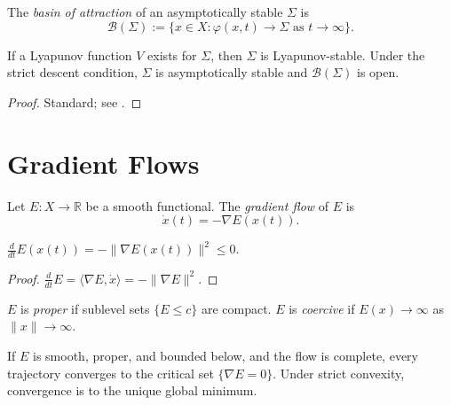 \documentclass[11pt,openany]{book}
\begin{document}
\begin{definition}
The \emph{basin of attraction} of an asymptotically stable
$\Sigma$ is
\[
  \mathcal{B}(\Sigma) := \{x \in X :
    \varphi(x,t) \to \Sigma \text{ as } t \to \infty\}.
\]
\end{definition}

\begin{theorem}
\label{thm:lyapunov-main}
If a Lyapunov function $V$ exists for $\Sigma$, then
$\Sigma$ is Lyapunov-stable.  Under the strict descent
condition, $\Sigma$ is asymptotically stable and
$\mathcal{B}(\Sigma)$ is open.
\end{theorem}

\begin{proof}
Standard; see \citep{strogatz2015nonlinear}.
\end{proof}

\section{Gradient Flows}
\label{sec:gradient-flows}

\begin{definition}
Let $E : X \to \mathbb{R}$ be a smooth functional.  The
\emph{gradient flow} of $E$ is
\[
  \dot{x}(t) = -\nabla E(x(t)).
\]
\end{definition}

\begin{proposition}
\label{prop:energy-descent-app}
$\frac{d}{dt} E(x(t)) = -\|\nabla E(x(t))\|^2 \le 0$.
\end{proposition}

\begin{proof}
$\frac{d}{dt}E = \langle \nabla E, \dot x\rangle =
-\|\nabla E\|^2$.
\end{proof}

\begin{definition}
$E$ is \emph{proper} if sublevel sets $\{E \le c\}$ are
compact.  $E$ is \emph{coercive} if $E(x) \to \infty$ as
$\|x\| \to \infty$.
\end{definition}

\begin{theorem}
\label{thm:gradient-convergence}
If $E$ is smooth, proper, and bounded below, and the flow
is complete, every trajectory converges to the critical
set $\{\nabla E = 0\}$.  Under strict convexity,
convergence is to the unique global minimum.
\end{theorem}
\end{document}
